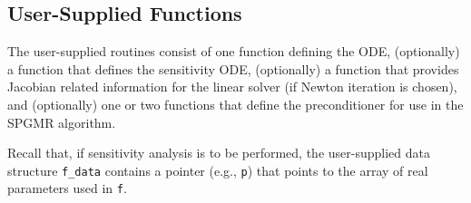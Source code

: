 
\subsection{User-Supplied Functions}

The user-supplied routines consist of one function defining the ODE, 
(optionally) a function that defines the sensitivity ODE, (optionally)
a function that provides Jacobian related information for the linear 
solver (if Newton iteration is chosen), 
and (optionally) one or two functions that define the preconditioner for
use in the SPGMR algorithm. 

Recall that, if sensitivity analysis is to be performed, the user-supplied 
data structure {\tt f\_data} contains a pointer (e.g., {\tt p}) that points 
to the array of real parameters used in {\tt f}.

